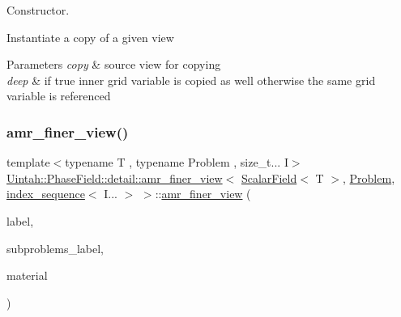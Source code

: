 Constructor. 

Instantiate a copy of a given view


\begin{DoxyParams}{Parameters}
{\em copy} & source view for copying \\
\hline
{\em deep} & if true inner grid variable is copied as well otherwise the same grid variable is referenced \\
\hline
\end{DoxyParams}
\mbox{\label{classUintah_1_1PhaseField_1_1detail_1_1amr__finer__view_3_01ScalarField_3_01T_01_4_00_01Problem_810ae3f886a4d3bdb2b37c629369a2ec_a73afae95bc743443a5e4a72820fdacf0}} 
\subsubsection{\texorpdfstring{amr\+\_\+finer\+\_\+view()}{amr\_finer\_view()}\hspace{0.1cm}{\footnotesize\ttfamily [2/4]}}
{\footnotesize\ttfamily template$<$typename T , typename Problem , size\+\_\+t... I$>$ \\
\hyperlink{classUintah_1_1PhaseField_1_1detail_1_1amr__finer__view}{Uintah\+::\+Phase\+Field\+::detail\+::amr\+\_\+finer\+\_\+view}$<$ \hyperlink{structUintah_1_1PhaseField_1_1ScalarField}{Scalar\+Field}$<$ T $>$, \hyperlink{classUintah_1_1PhaseField_1_1Problem}{Problem}, \hyperlink{namespaceUintah_1_1PhaseField_a237de804d99512e50613aff7c94a9461}{index\+\_\+sequence}$<$ I... $>$ $>$\+::\hyperlink{classUintah_1_1PhaseField_1_1detail_1_1amr__finer__view}{amr\+\_\+finer\+\_\+view} (\begin{DoxyParamCaption}\item[{const Var\+Label $\ast$}]{label,  }\item[{const Var\+Label $\ast$}]{subproblems\+\_\+label,  }\item[{int}]{material }\end{DoxyParamCaption})\hspace{0.3cm}{\ttfamily [inline]}}



